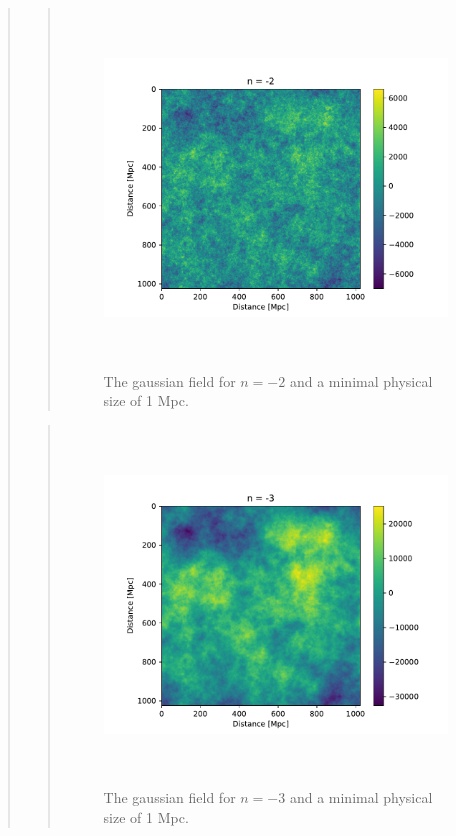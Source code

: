 \begin{quote}
\begin{quote}
\begin{figure}[!ht]
\centering
\includegraphics[width=14cm, height=9.5cm]{./Plots/2_field_-2.pdf}
\caption{The gaussian field for $n = -2$ and a minimal physical size of 1 Mpc.}
\end{figure}
\end{quote}

\newpage
\begin{quote}

\begin{figure}[!ht]
\centering
\includegraphics[width=14cm, height=9.5cm]{./Plots/2_field_-3.pdf}
\caption{The gaussian field for $n = -3$ and a minimal physical size of 1 Mpc.}
\end{figure}
\end{quote}



\end{quote}








